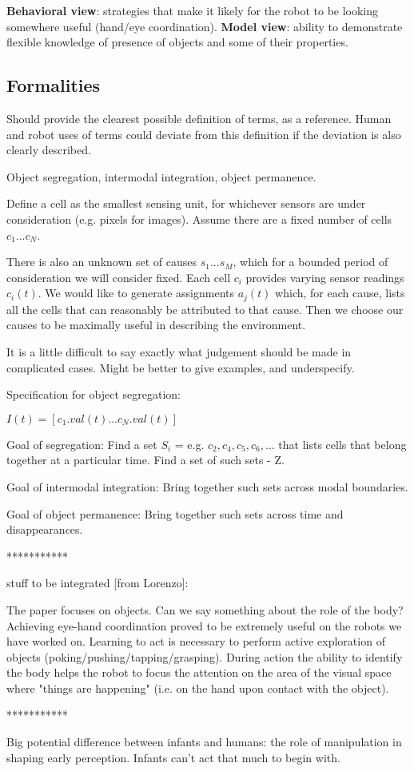 {\bf Behavioral view}: strategies that make it likely for the robot
to be looking somewhere useful (hand/eye coordination).
{\bf Model view}: ability to demonstrate flexible knowledge of presence of 
objects and some of their properties.


\subsection{Formalities}

Should provide the clearest possible definition of terms,
as a reference.  Human and robot uses of terms could deviate
from this definition if the deviation is also clearly described.

Object segregation, intermodal integration, object permanence.

Define a cell as the smallest sensing unit, for whichever sensors are
under consideration (e.g. pixels for images).  Assume there are a
fixed number of cells $c_1...c_{N}$.

There is also an unknown set of causes $s_1...s_{M}$, which for a
bounded period of consideration we will consider fixed.  Each cell
$c_i$ provides varying sensor readings $c_i(t)$.  We would like to
generate assignments $a_j(t)$ which, for each cause, lists all the
cells that can reasonably be attributed to that cause.  Then we choose
our causes to be maximally useful in describing the environment.

It is a little difficult to say exactly what judgement should be
made in complicated cases.  Might be better to give examples,
and underspecify.

Specification for object segregation:

$I(t) = [c_1.val(t) ... c_N.val(t)]$

Goal of segregation:
  Find a set $S_i$ = e.g. ${ c_2,c_4,c_5,c_6,... }$ that lists cells that
  belong together at a particular time.
  Find a set of such sets - Z.

Goal of intermodal integration:
  Bring together such sets across modal boundaries.

Goal of object permanence:
  Bring together such sets across time and disappearances.


***********

stuff to be integrated [from Lorenzo]:


The paper focuses on objects. Can we say something about the role of the
body? Achieving eye-hand coordination proved to be extremely useful on the
robots we have worked on. Learning to act is necessary to perform active
exploration of objects (poking/pushing/tapping/grasping). During action the
ability to identify the body helps the robot to focus the attention on the
area of the visual space where "things are happening" (i.e. on the hand upon
contact with the object).


***********

Big potential difference between infants and humans: the role
of manipulation in shaping early perception.  Infants can't
act that much to begin with.



